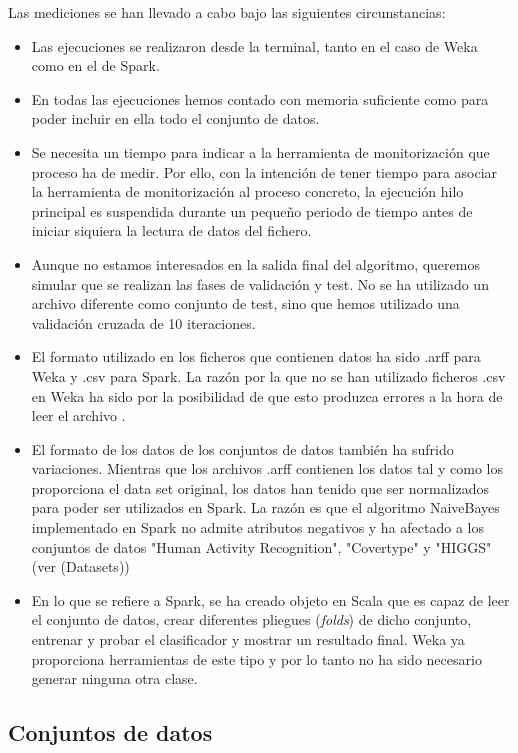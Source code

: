 Las mediciones se han llevado a cabo bajo las siguientes circunstancias:

\begin{itemize}
	\item Las ejecuciones se realizaron desde la terminal, tanto en el caso de Weka como en el de Spark.
	\item En todas las ejecuciones hemos contado con memoria suficiente como para poder incluir en ella todo el conjunto de datos.
	\item Se necesita un tiempo para indicar a la herramienta de monitorización que proceso ha de medir. Por ello, con la intención de tener tiempo para asociar la herramienta de monitorización al proceso concreto, la ejecución hilo principal es suspendida durante un pequeño periodo de tiempo antes de iniciar siquiera la lectura de datos del fichero.
	\item Aunque no estamos interesados en la salida final del algoritmo, queremos simular que se realizan las fases de validación y test. No se ha utilizado un archivo diferente como conjunto de test, sino que hemos utilizado una validación cruzada de 10 iteraciones.
	\item El formato utilizado en los ficheros que contienen datos ha sido .arff para Weka y .csv para Spark. La razón por la que no se han utilizado ficheros .csv en Weka ha sido por la posibilidad de que esto produzca errores a la hora de leer el archivo \cite{CSVWeka}.
	\item El formato de los datos de los conjuntos de datos también ha sufrido variaciones. Mientras que los archivos .arff contienen los datos tal y como los proporciona el data set original, los datos han tenido que ser normalizados para poder ser utilizados en Spark. La razón es que el algoritmo NaiveBayes implementado en Spark no admite atributos negativos y ha afectado a los conjuntos de datos "Human Activity Recognition", "Covertype" y "HIGGS"(ver \nameref(Datasets)) 
	\item En lo que se refiere a Spark, se ha creado objeto en Scala que es capaz de leer el conjunto de datos, crear diferentes pliegues (\textit{folds}) de dicho conjunto, entrenar y probar el clasificador y mostrar un resultado final. Weka ya proporciona herramientas de este tipo y por lo tanto no ha sido necesario generar ninguna otra clase.
	
\end{itemize}

\subsection{Conjuntos de datos}\label{Datasets}

